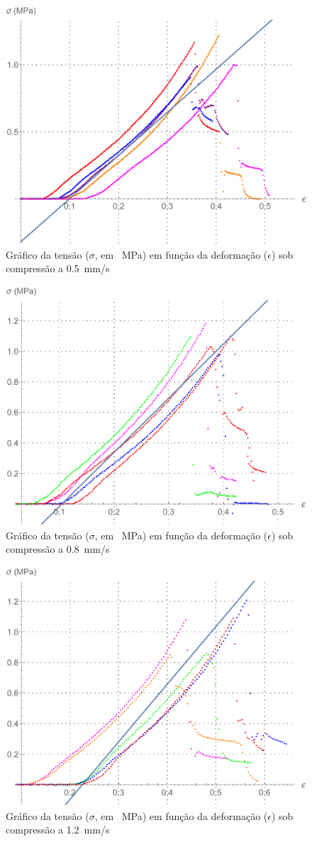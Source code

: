 \documentclass[a4paper, 12pt]{article}
\begin{document}
	\begin{figure}[h!]
		\centering
		\includegraphics[width=0.65\linewidth]{sections/images/g1}
		\caption{Gráfico da tensão ($\sigma$, em \SI{}{\mega\pascal}) em função da deformação ($\epsilon$) sob compressão a \SI{.5}{\milli\meter/\second}}
		\label{fig:g1}
	\end{figure}
	
	\begin{figure}[h!]
		\centering
		\includegraphics[width=0.65\linewidth]{sections/images/g2}
		\caption{Gráfico da tensão ($\sigma$, em \SI{}{\mega\pascal}) em função da deformação ($\epsilon$) sob compressão a \SI{.8}{\milli\meter/\second}}
		\label{fig:g2}
	\end{figure}
	
	\begin{figure}[h!]
		\centering
		\includegraphics[width=0.65\linewidth]{sections/images/g3}
		\caption{Gráfico da tensão ($\sigma$, em \SI{}{\mega\pascal}) em função da deformação ($\epsilon$) sob compressão a \SI{1.2}{\milli\meter/\second}}
		\label{fig:g3}
	\end{figure}
\end{document}
